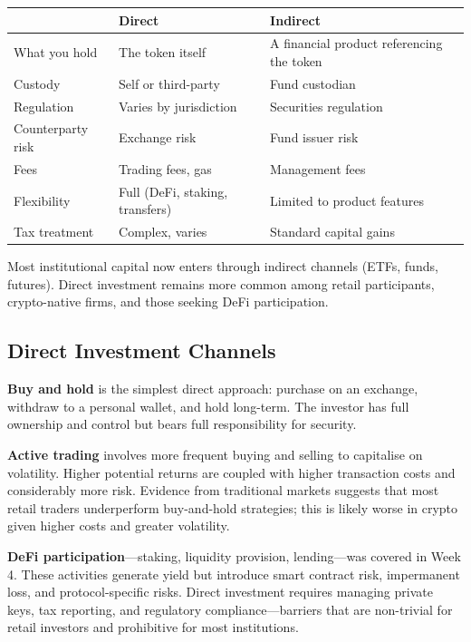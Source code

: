 \documentclass[11pt,a4paper]{article}
\begin{document}
\begin{center}
\begin{tabular}{lll}
\toprule
& \textbf{Direct} & \textbf{Indirect} \\
\midrule
What you hold & The token itself & A financial product referencing the token \\
Custody & Self or third-party & Fund custodian \\
Regulation & Varies by jurisdiction & Securities regulation \\
Counterparty risk & Exchange risk & Fund issuer risk \\
Fees & Trading fees, gas & Management fees \\
Flexibility & Full (DeFi, staking, transfers) & Limited to product features \\
Tax treatment & Complex, varies & Standard capital gains \\
\bottomrule
\end{tabular}
\end{center}

Most institutional capital now enters through indirect channels (ETFs, funds, futures). Direct investment remains more common among retail participants, crypto-native firms, and those seeking DeFi participation.

\subsection{Direct Investment Channels}

\textbf{Buy and hold} is the simplest direct approach: purchase on an exchange, withdraw to a personal wallet, and hold long-term. The investor has full ownership and control but bears full responsibility for security.

\textbf{Active trading} involves more frequent buying and selling to capitalise on volatility. Higher potential returns are coupled with higher transaction costs and considerably more risk. Evidence from traditional markets suggests that most retail traders underperform buy-and-hold strategies; this is likely worse in crypto given higher costs and greater volatility.

\textbf{DeFi participation}---staking, liquidity provision, lending---was covered in Week 4. These activities generate yield but introduce smart contract risk, impermanent loss, and protocol-specific risks. Direct investment requires managing private keys, tax reporting, and regulatory compliance---barriers that are non-trivial for retail investors and prohibitive for most institutions.
\end{document}
